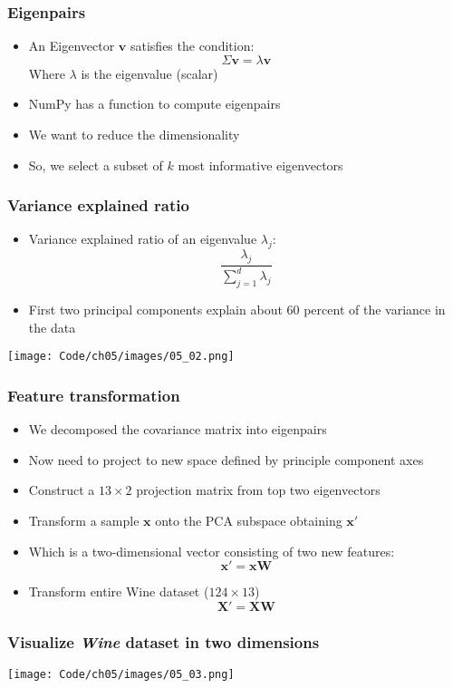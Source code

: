 \documentclass{beamer}
\begin{document}
\begin{frame}
  \frametitle{Eigenpairs}
  \begin{itemize}
  \item An Eigenvector $\mathbf{v}$ satisfies the condition:
    \[
    \Sigma \mathbf{v} = \lambda \mathbf{v}
    \]
    Where $\lambda$ is the eigenvalue (scalar)
  \item NumPy has a function to compute eigenpairs
  \item We want to reduce the dimensionality
  \item So, we select a subset of $k$ most informative eigenvectors
  \end{itemize}
\end{frame}

\begin{frame}
  \frametitle{Variance explained ratio}
  \begin{itemize}
  \item Variance explained ratio of an eigenvalue $\lambda_j$:
  \[
  \frac{\lambda_j}{\sum_{j=1}^{d} \lambda_j}
  \]
  \item First two principal components explain about 60 percent of the variance in the data
  \end{itemize}
  \texttt{[image: Code/ch05/images/05\_02.png]}
\end{frame}

\begin{frame}
  \frametitle{Feature transformation}
  \begin{itemize}
  \item We decomposed the covariance matrix into eigenpairs
  \item Now need to project to new space defined by principle component axes
  \item Construct a $13 \times 2$ projection matrix from top two eigenvectors
  \item Transform a sample $\mathbf{x}$ onto the PCA subspace obtaining $\mathbf{x}'$
  \item Which is a two-dimensional vector consisting of two new features:
    \[
    \mathbf{x}' = \mathbf{xW}
    \]
  \item Transform entire Wine dataset ($124 \times 13$)
    \[
    \mathbf{X}' = \mathbf{XW}
    \]
  \end{itemize}
\end{frame}

\begin{frame}
  \frametitle{Visualize \textit{Wine} dataset in two dimensions}
  \texttt{[image: Code/ch05/images/05\_03.png]}
\end{frame}
\end{document}
